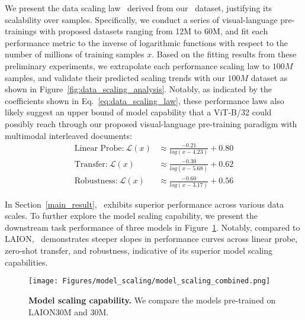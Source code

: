  We present the data scaling law~\cite{scaling_law} derived from our \dsname\ dataset, justifying its scalability over samples.
Specifically, we conduct a series of visual-language pre-trainings with proposed datasets ranging from 12M to 60M, and fit each performance metric to the inverse of logarithmic functions with respect to the number of millions of training samples $x$. Based on the fitting results from these preliminary experiments, we extrapolate each performance scaling law to $100M$ samples, and validate their predicted scaling trends with our \dsname$100M$ dataset as shown in Figure~\ref{fig:data_scaling_analysis}. Notably, as indicated by the coefficients shown in Eq.~\ref{eq:data_scaling_law}, these performance laws also likely suggest an upper bound of model capability that a ViT-B/32 could possibly reach through our proposed visual-language pre-training paradigm with multimodal interleaved documents:
\begin{equation}
\begin{aligned}
    \text{Linear Probe:} \ \mathcal{L}(x) &\approx \frac{-0.21}{log(x-4.23)} + 0.80 \\
    \text{Transfer:} \ \mathcal{L}(x) &\approx \frac{-0.30}{log(x-5.68)} + 0.62 \\
    \text{Robustness:} \ \mathcal{L}(x) &\approx \frac{-0.60}{log(x-3.17)} + 0.56
\end{aligned}
\label{eq:data_scaling_law}
\end{equation}



 In Section~\ref{main_result}, \dsname\ exhibits superior performance across various data scales. To further explore the model scaling capability, we present the downstream task performance of three models in Figure~\ref{model_scale}. Notably, compared to LAION, \dsname\ demonstrates steeper slopes in performance curves across linear probe, zero-shot transfer, and robustness, indicative of its superior model scaling capabilities.


\begin{figure}[t!]
\centering
\texttt{[image: Figures/model\_scaling/model\_scaling\_combined.png]}
\vspace{-5mm}
\caption{\textbf{Model scaling capability.} We compare the models pre-trained on LAION30M and \dsname30M.}
\label{model_scale}
\end{figure}


